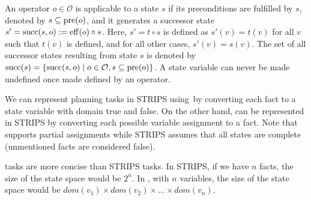 \documentclass[ppgc,diss,english]{iiufrgs}
\newcommand{\ppi}[2][inline]{\todo[color=purple!50,linecolor={purple!100},#1,fancyline,author=Pedro]{#2}}
\begin{document}
An operator $o \in \mathcal{O}$ is applicable to a state $s$ if its preconditions are fulfilled by $s$, denoted by $s \subseteq \operatorname{pre}(o)$, and it generates a successor state $s'=\operatorname{succ}(s,o):=\operatorname{eff}(o)\circ s$. Here, $s'=t\circ s$ is defined as $s'(v)=t(v)$ for all $v$ such that $t(v)$ is defined, and for all other cases, $s'(v)=s(v)$. The set of all successor states resulting from state $s$ is denoted by $\operatorname{succ}(s)=\{{\operatorname{succ}(s,o)\mid o\in \mathcal{O}, s \subseteq \operatorname{pre}(o)}\}$. A state variable can never be made undefined once made defined by an operator.

We can represent planning tasks in STRIPS using~\sas by converting each fact to a state variable with domain true and false. On the other hand, \sas can be represented in STRIPS by converting each possible variable assignment to a fact. Note that \sas supports partial assignments while STRIPS assumes that all states are complete (unmentioned facts are considered false).

\sas tasks are more concise than STRIPS tasks. In STRIPS, if we have $n$ facts, the size of the state space would be $2^n$. In \sas,  with $n$ variables, the size of the state space would be $dom(v_{1}) \times dom(v_{2}) \times \ldots \times dom(v_{n})$.

\end{document}
